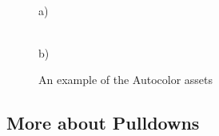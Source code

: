 \begin{figure}[htpb]
    \centering
    \begin{minipage}[h]{0.55\linewidth}
         \\ a)
    \end{minipage}
    \begin{minipage}[h]{0.4\linewidth}
         \\ b)
    \end{minipage}
    \caption{An example of the Autocolor assets}
    \label{fig:autocolor_assets_alpha}
\end{figure}


\subsection{More about Pulldowns}%
\label{sub:more_about_pulldowns}

